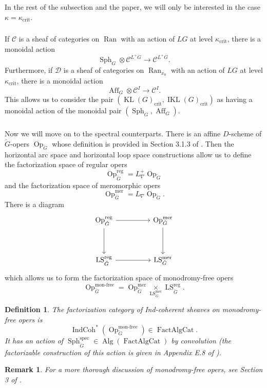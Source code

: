 \documentclass[10pt,a4paper]{amsart}
\newtheorem{defn}[subsubsection]{Definition}
\newtheorem{rem}[subsubsection]{Remark}
\newcommand{\on}[1]{\operatorname{#1}}
\newcommand{\IndCoh}{\on{IndCoh}}
\newcommand{\Gcheck}{\check{G}}
\newcommand{\Ran}{\on{Ran}}
\newcommand{\FactAlgCat}{\on{FactAlgCat}}
\newcommand{\sssec}[1]{\subsubsection{}}
\begin{document}
\sssec{}
In the rest of the subsection and the paper, we will only be interested in the case $\kappa = \kappa_{\on{crit}}$.

\sssec{}
If $\mathcal{C}$ is a sheaf of categories on $\Ran$ with an action of $LG$ at level $\kappa_{\on{crit}}$, there is a monoidal action
$$
\on{Sph}_G \otimes \mathcal{C}^{L^+G} \longrightarrow \mathcal{C}^{L^+G}.
$$
Furthermore, if $\mathcal{D}$ is a sheaf of categories on $\Ran_{x_0}$ with an action of $LG$ at level $\kappa_{\on{crit}}$, there is a monoidal action
$$
\on{Aff}_G \otimes \mathcal{C}^{I} \longrightarrow \mathcal{C}^{I}.
$$
This allows us to consider the pair $(\on{KL}(G)_{\on{crit}}, \on{IKL}(G)_{\on{crit}})$ as having a monoidal action of the monoidal pair $(\on{Sph}_G, \on{Aff}_G)$.

\sssec{}
Now we will move on to the spectral counterparts. There is an affine $D$-scheme of $\Gcheck$-opers $\on{Op}_{\Gcheck}$ whose definition is provided in Section 3.1.3 of \cite{GLC2}. Then the horizontal arc space and horizontal loop space constructions allow us to define the factorization space of regular opers
$$
\on{Op}_{\Gcheck}^{\on{reg}} = L_{\nabla}^+\on{Op}_{\Gcheck}
$$
and the factorization space of meromorphic opers
$$
\on{Op}_{\Gcheck}^{\on{mer}} = L_{\nabla}\on{Op}_{\Gcheck}.
$$
There is a diagram
$$
\begin{tikzcd}
	{\on{Op}_{\Gcheck}^{\on{reg}}} && {\on{Op}_{\Gcheck}^{\on{mer}}} \\
	\\
	{\on{LS}_{\Gcheck}^{\on{reg}}} && {\on{LS}_{\Gcheck}^{\on{mer}}}
	\arrow[from=1-1, to=1-3]
	\arrow[from=1-1, to=3-1]
	\arrow[from=1-3, to=3-3]
	\arrow[from=3-1, to=3-3]
\end{tikzcd}
$$
which allows us to form the factorization space of monodromy-free opers
$$
\on{Op}_{\Gcheck}^{\on{mon-free}} = \on{Op}_{\Gcheck}^{\on{mer}} \underset{\on{LS}_{\Gcheck}^{\on{mer}}}{\times} \on{LS}_{\Gcheck}^{\on{reg}}.
$$

\begin{defn}
    The factorization category of Ind-coherent sheaves on monodromy-free opers is 
    $$
    \IndCoh^*(\on{Op}_{\Gcheck}^{\on{mon-free}}) \in \FactAlgCat.
    $$
    It has an action of $\on{Sph}_{\Gcheck}^{\on{spec}} \in \on{Alg}(\FactAlgCat)$ by convolution (the factorizable construction of this action is given in Appendix E.8 of \cite{GLC2}).
\end{defn}

\begin{rem}
For a more thorough discussion of monodromy-free opers, see Section 3 of \cite{GLC2}.
\end{rem}
\end{document}
